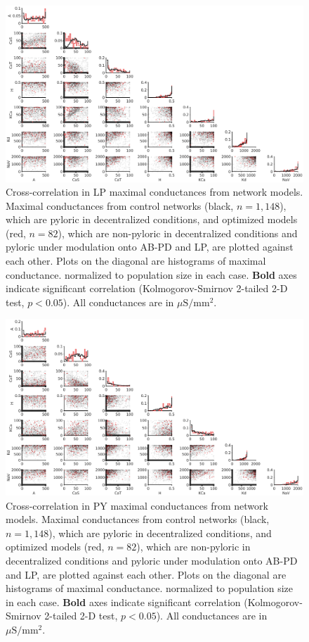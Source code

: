 \begin{figure}
	\centering
	\includegraphics[width=1.3\linewidth]{gfx/all-modulation/correlations_LP}
	\caption[Cross-correlations in LP model maximal conductances]{Cross-correlation in \acs{LP} maximal conductances from network models. Maximal conductances from control networks (black, $n=1,148$), which are pyloric in decentralized conditions, and optimized models (red, $n=82$), which are non-pyloric in decentralized conditions and pyloric under modulation onto \acs{AB}-\acs{PD} and \acs{LP}, are plotted against each other. Plots on the diagonal are histograms of maximal conductance. normalized to population size in each case. \textbf{Bold} axes indicate significant correlation (Kolmogorov-Smirnov 2-tailed 2-D test, $p<0.05$). All conductances are in $\mu\mathrm{S/mm^2}.$}  
	\label{fig:correlationslp}
\end{figure}

\begin{figure}
	\centering
	\includegraphics[width=1.3\linewidth]{gfx/all-modulation/correlations_PY}
	\caption[Cross-correlations in PY model maximal conductances]{Cross-correlation in \acs{PY} maximal conductances from network models. Maximal conductances from control networks (black, $n=1,148$), which are pyloric in decentralized conditions, and optimized models (red, $n=82$), which are non-pyloric in decentralized conditions and pyloric under modulation onto \acs{AB}-\acs{PD} and \acs{LP}, are plotted against each other. Plots on the diagonal are histograms of maximal conductance. normalized to population size in each case. \textbf{Bold} axes indicate significant correlation (Kolmogorov-Smirnov 2-tailed 2-D test, $p<0.05$). All conductances are in $\mu\mathrm{S/mm^2}.$}  
	\label{fig:correlationspy}
\end{figure}

